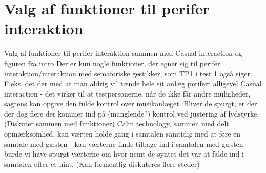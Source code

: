 \section{Valg af funktioner til perifer interaktion}
\label{DiskussionFunktionerCasualInteraction}
%
Valg af funktioner til perifer interaktion sammen med Casual interaction og figuren fra intro 
Der er kun nogle funktioner, der egner sig til perifer interaktion/interaktion med semaforiske gestikker, som TP1 i test 1 også siger. F.eks. det der med at man aldrig vil tænde hele sit anlæg perifert alligevel 
Casual interaction - det virker til at testpersonerne, når de ikke får andre muligheder, sagtens kan opgive den fulde kontrol over musikanlæget. Bliver de spurgt, er der der dog flere der kommer ind på (manglende?) kontrol ved justering af lydstyrke. (Diskuter sammen med funktioner)\blankline
%
Calm technology, sammen med delt opmærksomhed, kan værten holde gang i samtalen samtidig med at føre en samtale med gæsten - kan værterne finde tilbage ind i samtalen med gæsten - burde vi have spurgt værterne om hvor nemt de syntes det var at falde ind i samtalen efter et hint. (Kan formentlig diskuteres flere steder) \blankline